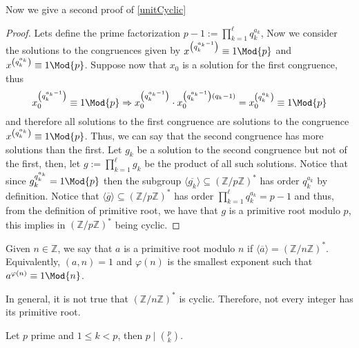 Now we give a second proof of \ref{unitCyclic}
\begin{proof}
   Lets define the prime factorization \(p-1 := \prod_{k=1}^{\ell} q_k^{a_k}\),
   Now we consider the solutions to the congruences given by  \(x^{\left(
   q_k^{a_k-1} \right)} \equiv 1 \Mod{p}\) and \(x^{\left( q_k^{a_k} \right) }
   \equiv 1 \Mod{p}\). Suppose now that \(x_0\) is a solution for the first
   congruence, thus 
    \[
       x_0^{\left( q_k^{a_k-1} \right) } \equiv 1 \Mod{p}
       \Rightarrow 
       x_0^{\left( q_k^{a_k-1} \right) } \cdot x_0^{\left( q_k^{a_k-1}
       \right)(q_k-1) } 
       = x_0^{\left( q_k^{a_k} \right) } \equiv 1 \Mod{p}
   \] 
   and therefore all solutions to the first congruence are solutions to the
   congruence \(x^{\left( q_k^{a_k} \right) } \equiv 1 \Mod{p}\). Thus, we can
   say that the second congruence has more solutions than the first. Let \(g_k\)
   be a solution to the second congruence but not of the first, then, let \(g :=
   \prod_{k=1}^\ell g_k\) be the product of all such solutions. Notice that
   since \(g_k^{q_k^{a_k}} = 1 \Mod{p}\) then the subgroup \(\langle
   \overline{g_k} \rangle \subseteq (\mathbb{Z}/p\mathbb{Z})^\ast\) has order
   \(q_k^{a_k}\) by definition. Notice that \(\langle \overline{g} \rangle
   \subseteq (\mathbb{Z}/p\mathbb{Z})^\ast\) has order \(\prod_{k=1}^\ell
   q_k^{a_k} = p-1\) and thus, from the definition of primitive root, we have
   that \(g\) is a primitive root modulo \(p\), this implies in
   \((\mathbb{Z}/p\mathbb{Z})^\ast\) being cyclic. 
\end{proof}

\begin{definition}
   Given \(n \in \mathbb{Z}\), we say that \(a\) is a primitive root modulo
   \(n\) if  \(\langle \overline{a} \rangle = (\mathbb{Z}/n\mathbb{Z})^\ast\).
   Equivalently, \((a, n) = 1\) and \(\varphi(n)\) is the smallest exponent such
   that \(a^{\varphi(n)} \equiv 1 \Mod{n}\).
\end{definition}

\begin{remark}
   In general, it is not true that \((\mathbb{Z}/n\mathbb{Z})^\ast\) is cyclic.
   Therefore, not every integer has its primitive root.
\end{remark}

\begin{lemma}
   Let \(p\) prime and  \(1 \leqslant k < p\), then \(p \mid \binom{p}{k}\).
\end{lemma}

